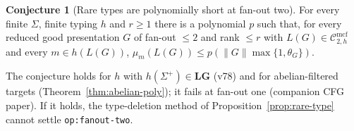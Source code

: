 \documentclass[11pt]{article}
\theoremstyle{definition}
\newtheorem{conjecture}[theorem]{Conjecture}
\theoremstyle{remark}
\newcommand{\Cmcf}[2]{\mathcal{C}^{\mathrm{mcf}}_{#1,#2}}
\begin{document}
\begin{conjecture}[Rare types are polynomially short at fan-out two]
For every finite $\Sigma$, finite typing $h$ and $r\ge1$ there is a
polynomial $p$ such that, for every reduced good presentation $G$ of
fan-out $\le2$ and rank $\le r$ with $L(G)\in\Cmcf{2}{h}$ and every
$m\in h(L(G))$, $\mu_m(L(G))\le p(\|G\|\max\{1,\theta_G\})$.
\end{conjecture}
The conjecture holds for $h$ with $h(\Sigma^+)\in\mathbf{LG}$ (v78) and for
abelian-filtered targets (Theorem~\ref{thm:abelian-poly}); it fails at
fan-out one (companion CFG paper).  If it holds, the type-deletion method
of Proposition~\ref{prop:rare-type} cannot settle \texttt{op:fanout-two}.
\end{document}
